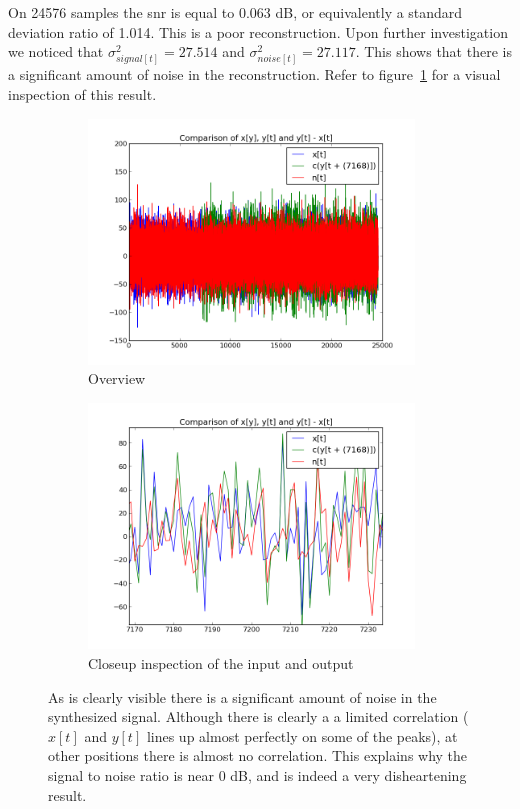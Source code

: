 \documentclass[a4paper,10pt]{article}
\begin{document}
On 24576 samples the \gls{snr} is equal to 0.063 dB, or equivalently a standard deviation ratio of 1.014. This is a poor reconstruction. Upon further investigation we noticed that
$\sigma_{signal[t]}^2=27.514$ and $\sigma_{noise[t]}^2=27.117$. This shows that there is a significant amount of noise in the reconstruction. Refer to figure~\ref{snr} for a visual
inspection of this result.
\begin{figure}[ht!]
 \centering
 \begin{subfigure}{0.49\textwidth}
  \includegraphics[width=0.95\textwidth]{overview_snr}
  \caption{Overview}
 \end{subfigure}
 \begin{subfigure}{0.49\textwidth}
  \includegraphics[width=0.95\textwidth]{snr_zoomed.png}
  \caption{Closeup inspection of the input and output}
 \end{subfigure}
\caption[Reconstruction quality]{As is clearly visible there is a significant amount of noise in the synthesized signal. Although there is clearly a a limited correlation ($x[t]$ and $y[t]$ lines up 
almost perfectly on some of the peaks), at other positions there is almost no correlation. This explains why the signal to noise ratio is near 0 dB, and is indeed a very
disheartening result.}
\label{snr}
\end{figure}
\end{document}
